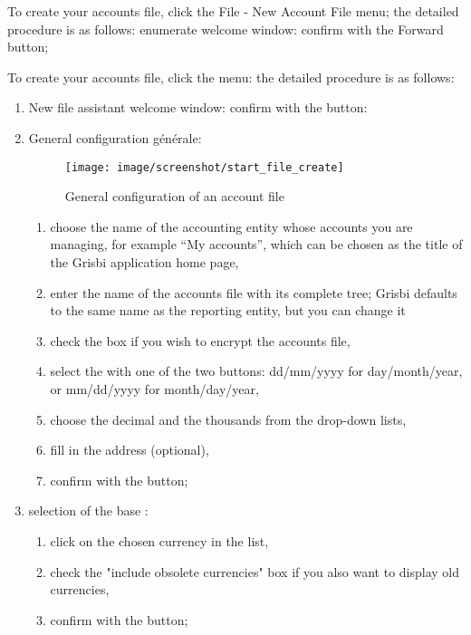 To create your accounts file, click the File - New Account File menu; the detailed procedure is as follows:
enumerate
welcome window: confirm with the Forward button;

To create your accounts file, click the  menu: the detailed procedure is as follows:

\begin{enumerate}
\item New file assistant welcome window: confirm with the  button:
\item General configuration
générale:




\begin{figure}[htbp]
\begin{center}
\texttt{[image: image/screenshot/start\_file\_create]}
\end{center}
\caption{General configuration of an account file}
\label{start-file-create-img}
\end{figure}



\begin{enumerate} 
 \item choose the name of the accounting entity whose accounts you are managing, for example \enquote{My accounts}, which can be chosen as the title of the Grisbi application home page,
\item enter the name of the accounts file with its complete tree; Grisbi defaults to the same name as the reporting entity, but you can change it
\item check the   box if you wish \gls{to encrypt} the accounts file,
\item select the  with one of the two buttons: dd/mm/yyyy for day/month/year, or  mm/dd/yyyy for month/day/year,
\item choose the decimal  and the thousands from the drop-down lists,
 \item fill in the address (optional),
 \item  confirm with the   button;
\end{enumerate}

\item selection of the base :
\begin{enumerate} 
 \item click on the chosen currency in the list,
\item check the "include obsolete currencies" box if you also want to display old currencies,
\item confirm with the  button;
\end{enumerate}


\end{enumerate}
